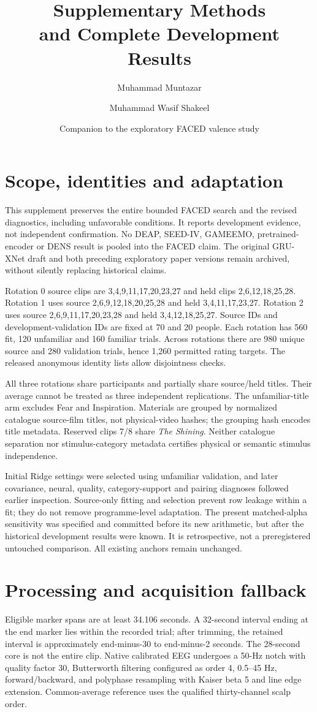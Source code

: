 \documentclass[10pt,a4paper]{article}
\title{Supplementary Methods\\and Complete Development Results}
\author{Muhammad Muntazar \and Muhammad Wasif Shakeel}
\date{Companion to the exploratory FACED valence study}
\begin{document}
\maketitle

\section{Scope, identities and adaptation}
This supplement preserves the entire bounded FACED search and the revised diagnostics, including unfavorable conditions. It reports development evidence, not independent confirmation. No DEAP, SEED-IV, GAMEEMO, pretrained-encoder or DENS result is pooled into the FACED claim. The original GRU-XNet draft and both preceding exploratory paper versions remain archived, without silently replacing historical claims.

Rotation 0 source clips are 3,4,9,11,17,20,23,27 and held clips 2,6,12,18,25,28. Rotation 1 uses source 2,6,9,12,18,20,25,28 and held 3,4,11,17,23,27. Rotation 2 uses source 2,6,9,11,17,20,23,28 and held 3,4,12,18,25,27. Source IDs and development-validation IDs are fixed at 70 and 20 people. Each rotation has 560 fit, 120 unfamiliar and 160 familiar trials. Across rotations there are 980 unique source and 280 validation trials, hence 1,260 permitted rating targets. The released anonymous identity lists allow disjointness checks.

All three rotations share participants and partially share source/held titles. Their average cannot be treated as three independent replications. The unfamiliar-title arm excludes Fear and Inspiration. Materials are grouped by normalized catalogue source-film titles, not physical-video hashes; the grouping hash encodes title metadata. Reserved clips 7/8 share \emph{The Shining}. Neither catalogue separation nor stimulus-category metadata certifies physical or semantic stimulus independence.

Initial Ridge settings were selected using unfamiliar validation, and later covariance, neural, quality, category-support and pairing diagnoses followed earlier inspection. Source-only fitting and selection prevent row leakage within a fit; they do not remove programme-level adaptation. The present matched-alpha sensitivity was specified and committed before its new arithmetic, but after the historical development results were known. It is retrospective, not a preregistered untouched comparison. All existing anchors remain unchanged.

\section{Processing and acquisition fallback}
Eligible marker spans are at least 34.106 seconds. A 32-second interval ending at the end marker lies within the recorded trial; after trimming, the retained interval is approximately end-minus-30 to end-minus-2 seconds. The 28-second core is not the entire clip. Native calibrated EEG undergoes a 50-Hz notch with quality factor 30, Butterworth filtering configured as order 4, 0.5--45 Hz, forward/backward, and polyphase resampling with Kaiser beta 5 and line edge extension. Common-average reference uses the qualified thirty-channel scalp order.
\end{document}
